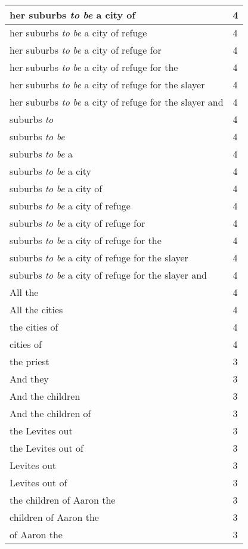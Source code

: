 \begin{center}
\begin{longtable}{|p{3.0in}|p{0.5in}|}
her suburbs \emph{to} \emph{be} a city of & 4\\ \hline 
her suburbs \emph{to} \emph{be} a city of refuge & 4\\ \hline 
her suburbs \emph{to} \emph{be} a city of refuge for & 4\\ \hline 
her suburbs \emph{to} \emph{be} a city of refuge for the & 4\\ \hline 
her suburbs \emph{to} \emph{be} a city of refuge for the slayer & 4\\ \hline 
her suburbs \emph{to} \emph{be} a city of refuge for the slayer and & 4\\ \hline 
suburbs \emph{to} & 4\\ \hline 
suburbs \emph{to} \emph{be} & 4\\ \hline 
suburbs \emph{to} \emph{be} a & 4\\ \hline 
suburbs \emph{to} \emph{be} a city & 4\\ \hline 
suburbs \emph{to} \emph{be} a city of & 4\\ \hline 
suburbs \emph{to} \emph{be} a city of refuge & 4\\ \hline 
suburbs \emph{to} \emph{be} a city of refuge for & 4\\ \hline 
suburbs \emph{to} \emph{be} a city of refuge for the & 4\\ \hline 
suburbs \emph{to} \emph{be} a city of refuge for the slayer & 4\\ \hline 
suburbs \emph{to} \emph{be} a city of refuge for the slayer and & 4\\ \hline 
All the & 4\\ \hline 
All the cities & 4\\ \hline 
the cities of & 4\\ \hline 
cities of & 4\\ \hline 
the priest & 3\\ \hline 
And they & 3\\ \hline 
And the children & 3\\ \hline 
And the children of & 3\\ \hline 
the Levites out & 3\\ \hline 
the Levites out of & 3\\ \hline 
Levites out & 3\\ \hline 
Levites out of & 3\\ \hline 
the children of Aaron the & 3\\ \hline 
children of Aaron the & 3\\ \hline 
of Aaron the & 3\\ \hline 

\end{longtable}
\end{center}
